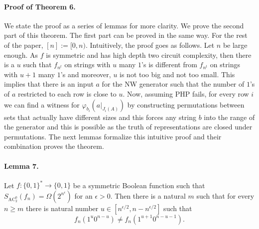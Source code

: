\paragraph{Proof of Theorem 6.} We state the proof as a series of lemmas for more clarity. We prove the second part of this theorem. The first part can be proved in the same way. For the rest of the paper, $[n]:=[0,n)$.
Intuitively, the proof goes as follows. Let $n$ be large enough. As $f$ is symmetric and has high depth two circuit complexity, then there is a $u$ such that $f_{n^t}$ on strings with $u$ many $1$'s is different from $f_{n^t}$ on strings with $u+1$ many $1$'s and moreover, $u$ is not too big and not too small. This implies that there is an input $a$ for the NW generator such that the number of $1$'s of $a$ restricted to each row is close to $u$. Now, assuming PHP fails, for every row $i$ we can find a witness for $\varphi_{b_i}(a|_{J_i(A)})$ by constructing permutations between sets that actually have different sizes and this forces any string $b$ into the range of the generator and this is possible as the truth of representations are closed under permutations. The next lemmas formalize this intuitive proof and their combination proves the theorem.
\paragraph{Lemma 7.} Let $f:\{0,1\}^*\to\{0,1\}$ be a symmetric Boolean function such that $S_{\mathrm{AC}_2^0}(f_n)=\Omega(2^{n^\epsilon})$ for an $\epsilon>0$. Then there is a natural $m$ such that for every $n\geq m$ there is natural number $u\in[n^{\epsilon/2},n-n^{\epsilon/2}]$ such that
\[f_n(1^u0^{n-u})\neq f_n(1^{u+1}0^{n-u-1}).\]
